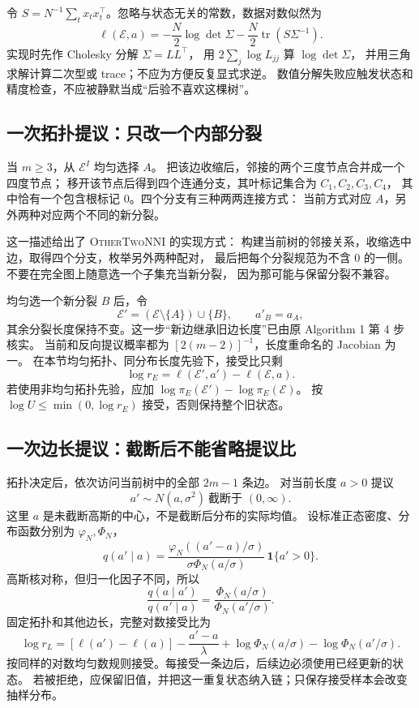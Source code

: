 \documentclass[UTF8,11pt,fontset=fandol,openany,oneside]{ctexbook}
\theoremstyle{definition}
\theoremstyle{remark}
\numberwithin{equation}{chapter}
\begin{document}
令 $S=N^{-1}\sum_tx_tx_t^\top$。忽略与状态无关的常数，数据对数似然为
\begin{equation}
 \ell(\mathcal E,a)
 =-\frac N2\log\det\Sigma
  -\frac N2\operatorname{tr}(S\Sigma^{-1}).
 \label{eq:textbook-S16-loglik}
\end{equation}
实现时先作 Cholesky 分解 $\Sigma=LL^\top$，
用 $2\sum_j\log L_{jj}$ 算 $\log\det\Sigma$，
并用三角求解计算二次型或 trace；不应为方便反复显式求逆。
数值分解失败应触发状态和精度检查，不应被静默当成“后验不喜欢这棵树”。

\subsection{一次拓扑提议：只改一个内部分裂}

当 $m\ge3$，从 $\mathcal E^I$ 均匀选择 $A$。
把该边收缩后，邻接的两个三度节点合并成一个四度节点；
移开该节点后得到四个连通分支，其叶标记集合为 $C_1,C_2,C_3,C_4$，
其中恰有一个包含根标记 $0$。四个分支有三种两两连接方式：
当前方式对应 $A$，另外两种对应两个不同的新分裂。

这一描述给出了 \textsc{OtherTwoNNI} 的实现方式：
构建当前树的邻接关系，收缩选中边，取得四个分支，枚举另外两种配对，
最后把每个分裂规范为不含 $0$ 的一侧。不要在完全图上随意选一个子集充当新分裂，
因为那可能与保留分裂不兼容。

均匀选一个新分裂 $B$ 后，令
\[
 \mathcal E'=(\mathcal E\setminus\{A\})\cup\{B\},\qquad
 a'_B=a_A,
\]
其余分裂长度保持不变。这一步“新边继承旧边长度”已由原 Algorithm 1 第 4 步核实。
当前和反向提议概率都为 $[2(m-2)]^{-1}$，长度重命名的 Jacobian 为一。
在本节均匀拓扑、同分布长度先验下，接受比只剩
\[
 \log r_E=\ell(\mathcal E',a')-\ell(\mathcal E,a).
\]
若使用非均匀拓扑先验，应加
$\log\pi_E(\mathcal E')-\log\pi_E(\mathcal E)$。
按 $\log U\le\min(0,\log r_E)$ 接受，否则保持整个旧状态。

\subsection{一次边长提议：截断后不能省略提议比}

拓扑决定后，依次访问当前树中的全部 $2m-1$ 条边。
对当前长度 $a>0$ 提议
\[
 a'\sim N(a,\sigma^2)\ \text{截断于 }(0,\infty).
\]
这里 $a$ 是未截断高斯的中心，不是截断后分布的实际均值。
设标准正态密度、分布函数分别为 $\varphi_N,\Phi_N$，
\[
 q(a'\mid a)=
 \frac{\varphi_N((a'-a)/\sigma)}
 {\sigma\Phi_N(a/\sigma)}\,\mathbf1\{a'>0\}.
\]
高斯核对称，但归一化因子不同，所以
\[
 \frac{q(a\mid a')}{q(a'\mid a)}
 =\frac{\Phi_N(a/\sigma)}{\Phi_N(a'/\sigma)}.
\]
固定拓扑和其他边长，完整对数接受比为
\begin{equation}
 \log r_L=
 [\ell(a')-\ell(a)]
 -\frac{a'-a}{\lambda}
 +\log\Phi_N(a/\sigma)-\log\Phi_N(a'/\sigma).
 \label{eq:textbook-S16-length-ratio}
\end{equation}
按同样的对数均匀数规则接受。每接受一条边后，后续边必须使用已经更新的状态。
若被拒绝，应保留旧值，并把这一重复状态纳入链；只保存接受样本会改变抽样分布。
\end{document}
